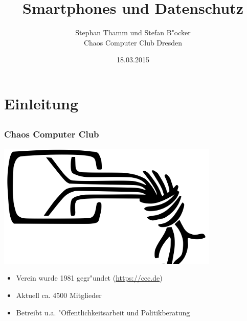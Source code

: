 \documentclass[12pt]{beamer}
\title{Smartphones und Datenschutz}
\author{\small Stephan Thamm und Stefan B"ocker\\\large Chaos Computer Club Dresden}
\date{18.03.2015}
\begin{document}
\maketitle


\section{Einleitung}
\subsection{}

\begin{frame}
    \frametitle{Chaos Computer Club}
    \begin{center}
	\includegraphics[height=0.2\textheight]{img/chaosknoten.png}
    \end{center}	
    \begin{itemize}
      \item<1-> Verein wurde 1981 gegr"undet (\url{https://ccc.de})          
      \item<2-> Aktuell ca. 4500 Mitglieder
      \item<3-> Betreibt u.a. "Offentlichkeitsarbeit und Politikberatung      
    \end{itemize}
\end{frame}
\end{document}

